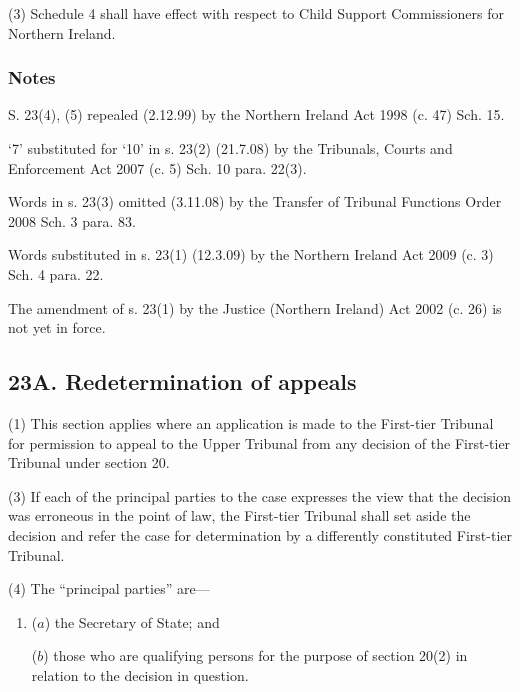 \documentclass[a4paper]{article}
\newcommand\amendment[1]{\subsubsection*{Notes}{\itshape\frenchspacing\footnotesize #1 \par}}
\begin{document}
(3)
Schedule 4 shall have effect with respect to Child Support Commissioners for Northern Ireland.

%

\amendment{

S. 23(4), (5) repealed (2.12.99) by the Northern Ireland Act 1998 (c. 47) Sch. 15.

‘7’ substituted for ‘10’ in s. 23(2) (21.7.08) by the Tribunals, Courts and Enforcement Act
2007 (c. 5) Sch. 10 para. 22(3).

Words in s. 23(3) omitted (3.11.08) by the Transfer of Tribunal Functions Order 2008 Sch. 3 para. 83.

Words substituted in s. 23(1) (12.3.09) by the Northern Ireland Act 2009 (c. 3) Sch. 4 para. 22. 

The amendment of s. 23(1) by the Justice (Northern Ireland) Act 2002 (c. 26) is not yet in force.

}

\subsection{23A. Redetermination of appeals}

(1) This section applies where an application is made to the First-tier Tribunal for permission to appeal to the Upper Tribunal from any decision of the First-tier Tribunal under section 20.

(3) If each of the principal parties to the case expresses the view that the decision was erroneous in the point of law, the First-tier Tribunal shall set aside the decision and refer the case for determination by a differently constituted First-tier Tribunal.

(4) The “principal parties” are---
\begin{enumerate}\item[]
($a$) the Secretary of State; and

($b$) those who are qualifying persons for the purpose of section 20(2) in relation
to the decision in question.
\end{enumerate}
\end{document}
